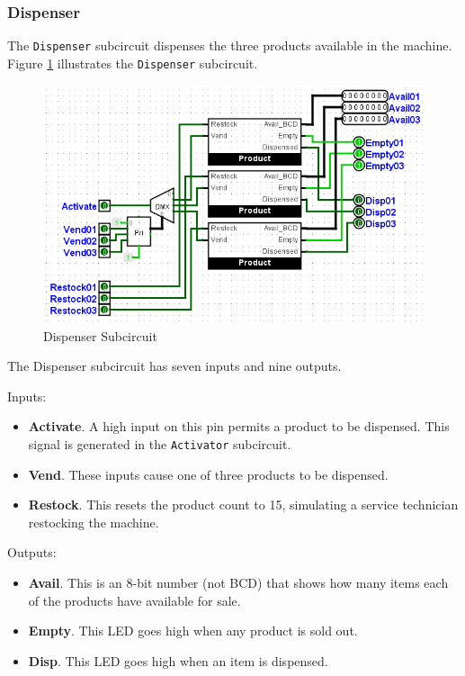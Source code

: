 \subsubsection{Dispenser}

The \lstinline[columns=fixed]|Dispenser| subcircuit dispenses the three products available in the machine. Figure \ref{fig:05-04} illustrates the \lstinline[columns=fixed]|Dispenser| subcircuit.

\begin{figure}[H]
	\centering
	\includegraphics[width=\maxwidth{.95\linewidth}]{gfx/05-04}
	\caption{Dispenser Subcircuit}
	\label{fig:05-04}
\end{figure}

The Dispenser subcircuit has seven inputs and nine outputs.

Inputs:

\begin{itemize}
	\item \textbf{Activate}. A high input on this pin permits a product to be dispensed. This signal is generated in the \lstinline[columns=fixed]|Activator| subcircuit.
	\item \textbf{Vend}. These inputs cause one of three products to be dispensed.
	\item \textbf{Restock}. This resets the product count to 15, simulating a service technician restocking the machine.
\end{itemize}

Outputs:

\begin{itemize}
	\item \textbf{Avail}. This is an 8-bit number (not \ac{BCD}) that shows how many items each of the products have available for sale.
	\item \textbf{Empty}. This LED goes high when any product is sold out.
	\item \textbf{Disp}. This LED goes high when an item is dispensed.
\end{itemize}

